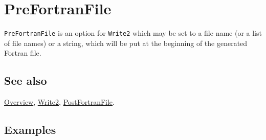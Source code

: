 \documentclass[../FeynCalcManual.tex]{subfiles}
\begin{document}
\hypertarget{prefortranfile}{%
\section{PreFortranFile}\label{prefortranfile}}

\texttt{PreFortranFile} is an option for \texttt{Write2} which may be
set to a file name (or a list of file names) or a string, which will be
put at the beginning of the generated Fortran file.

\subsection{See also}

\hyperlink{toc}{Overview}, \hyperlink{write2}{Write2},
\hyperlink{postfortranfile}{PostFortranFile}.

\subsection{Examples}
\end{document}
